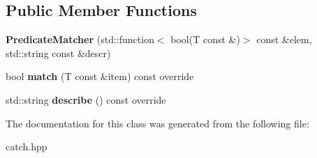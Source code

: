 \subsection*{Public Member Functions}
\begin{DoxyCompactItemize}
\item 
{\bfseries Predicate\+Matcher} (std\+::function$<$ bool(T const \&)$>$ const \&elem, std\+::string const \&descr)\hypertarget{classCatch_1_1Matchers_1_1Generic_1_1PredicateMatcher_a57d53ef028c2f7b92b016f627f91aa76}{}\label{classCatch_1_1Matchers_1_1Generic_1_1PredicateMatcher_a57d53ef028c2f7b92b016f627f91aa76}

\item 
bool {\bfseries match} (T const \&item) const override\hypertarget{classCatch_1_1Matchers_1_1Generic_1_1PredicateMatcher_a2ec0e8ec19c4c5e26271d59a06a62b52}{}\label{classCatch_1_1Matchers_1_1Generic_1_1PredicateMatcher_a2ec0e8ec19c4c5e26271d59a06a62b52}

\item 
std\+::string {\bfseries describe} () const override\hypertarget{classCatch_1_1Matchers_1_1Generic_1_1PredicateMatcher_af7d59e94892cc09471bbaefac4c889fd}{}\label{classCatch_1_1Matchers_1_1Generic_1_1PredicateMatcher_af7d59e94892cc09471bbaefac4c889fd}

\end{DoxyCompactItemize}


The documentation for this class was generated from the following file\+:\begin{DoxyCompactItemize}
\item 
catch.\+hpp\end{DoxyCompactItemize}
